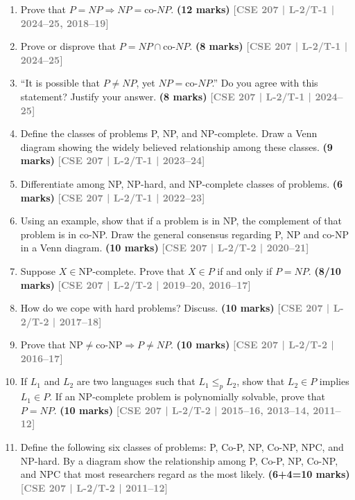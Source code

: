 \documentclass[12pt]{article}
\newcommand{\yr}[1]{\hfill\textcolor{gray}{\small\textbf{[#1]}}}
\newcommand{\mk}[1]{\textcolor{orange!70!black}{\small\textbf{(#1 marks)}}}
\begin{document}
\begin{enumerate}

\item Prove that $P = NP \Rightarrow NP = \text{co-}NP$.
\mk{12} \yr{CSE 207 | L-2/T-1 | 2024--25, 2018--19}


\item Prove or disprove that $P = NP \cap \text{co-}NP$.
\mk{8} \yr{CSE 207 | L-2/T-1 | 2024--25}


\item ``It is possible that $P \neq NP$, yet $NP = \text{co-}NP$.'' Do you agree with this statement? Justify your answer.
\mk{8} \yr{CSE 207 | L-2/T-1 | 2024--25}


\item Define the classes of problems P, NP, and NP-complete. Draw a Venn diagram showing the widely believed relationship among these classes.
\mk{9} \yr{CSE 207 | L-2/T-1 | 2023--24}


\item Differentiate among NP, NP-hard, and NP-complete classes of problems.
\mk{6} \yr{CSE 207 | L-2/T-1 | 2022--23}


\item Using an example, show that if a problem is in NP, the complement of that problem is in co-NP. Draw the general consensus regarding P, NP and co-NP in a Venn diagram.
\mk{10} \yr{CSE 207 | L-2/T-2 | 2020--21}


\item Suppose $X \in \text{NP-complete}$. Prove that $X \in P$ if and only if $P = NP$.
\mk{8/10} \yr{CSE 207 | L-2/T-2 | 2019--20, 2016--17}


\item How do we cope with hard problems? Discuss. \mk{10}
\yr{CSE 207 | L-2/T-2 | 2017--18}




\item Prove that $\text{NP} \neq \text{co-NP} \Rightarrow P \neq NP$. \mk{10}
\yr{CSE 207 | L-2/T-2 | 2016--17}


\item If $L_1$ and $L_2$ are two languages such that $L_1 \leq_p L_2$, show that $L_2 \in P$ implies $L_1 \in P$. If an NP-complete problem is polynomially solvable, prove that $P = NP$. \mk{10}
\yr{CSE 207 | L-2/T-2 | 2015--16, 2013--14, 2011--12}


\item Define the following six classes of problems: P, Co-P, NP, Co-NP, NPC, and NP-hard. By a diagram show the relationship among P, Co-P, NP, Co-NP, and NPC that most researchers regard as the most likely. \mk{6+4=10}
\yr{CSE 207 | L-2/T-2 | 2011--12}


\end{enumerate}
\end{document}
